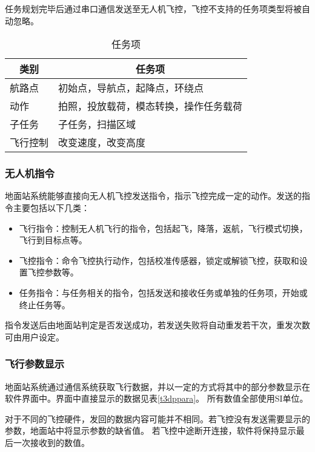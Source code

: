 任务规划完毕后通过串口通信发送至无人机飞控，飞控不支持的任务项类型将被自动忽略。

\begin{table}[ht]
\centering
\caption{任务项}
\label{t3miss}
\begin{tabular}{|l|l|}
\hline
\multicolumn{1}{|c|}{类别} & \multicolumn{1}{c|}{任务项} \\ \hline
航路点                      & 初始点，导航点，起降点，环绕点          \\ \hline
动作                       & 拍照，投放载荷，模态转换，操作任务载荷      \\ \hline
子任务                       & 子任务，扫描区域                 \\ \hline
飞行控制                     & 改变速度，改变高度                \\ \hline
\end{tabular}
\end{table}

\subsubsection{无人机指令}
地面站系统能够直接向无人机飞控发送指令，指示飞控完成一定的动作。发送的指令主要包括以下几类：
\begin{itemize}
\setlength{\itemsep}{-2pt}
\item 飞行指令：控制无人机飞行的指令，包括起飞，降落，返航，飞行模式切换，飞行到目标点等。
\item 飞控指令：命令飞控执行动作，包括校准传感器，锁定或解锁飞控，获取和设置飞控参数等。
\item 任务指令：与任务相关的指令，包括发送和接收任务或单独的任务项，开始或终止任务等。
\end{itemize}

指令发送后由地面站判定是否发送成功，若发送失败将自动重发若干次，重发次数可由用户设定。


\subsubsection{飞行参数显示}
地面站系统通过通信系统获取飞行数据，并以一定的方式将其中的部分参数显示在软件界面中。界面中直接显示的数据见表\ref{t3dppara}。
所有数值全部使用SI单位。

对于不同的飞控硬件，发回的数据内容可能并不相同。若飞控没有发送需要显示的参数，地面站中将显示参数的缺省值。
若飞控中途断开连接，软件将保持显示最后一次接收到的数值。

